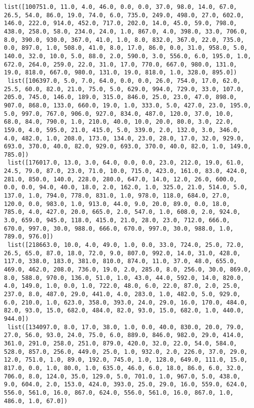 \documentclass[11pt]{article}
\begin{document}
\begin{Verbatim}[commandchars=\\\{\}]
 list([100751.0, 11.0, 4.0, 46.0, 0.0, 0.0, 37.0, 98.0, 14.0, 67.0, 26.5, 54.0, 86.0, 19.0, 74.0, 6.0, 735.0, 249.0, 498.0, 27.0, 602.0, 146.0, 222.0, 914.0, 452.0, 717.0, 202.0, 14.0, 45.0, 59.0, 798.0, 438.0, 258.0, 58.0, 234.0, 24.0, 1.0, 867.0, 4.0, 398.0, 33.0, 706.0, 8.0, 390.0, 930.0, 367.0, 41.0, 1.0, 8.0, 832.0, 367.0, 22.0, 735.0, 0.0, 897.0, 1.0, 508.0, 41.0, 8.0, 17.0, 86.0, 0.0, 31.0, 958.0, 5.0, 140.0, 32.0, 10.0, 5.0, 88.0, 2.0, 590.0, 3.0, 556.0, 6.0, 195.0, 1.0, 672.0, 264.0, 259.0, 22.0, 31.0, 17.0, 770.0, 667.0, 980.0, 131.0, 19.0, 818.0, 667.0, 980.0, 131.0, 19.0, 818.0, 1.0, 328.0, 895.0])
 list([106397.0, 5.0, 7.0, 64.0, 0.0, 0.0, 26.0, 754.0, 17.0, 62.0, 25.5, 60.0, 82.0, 21.0, 75.0, 5.0, 629.0, 994.0, 729.0, 33.0, 107.0, 205.0, 745.0, 146.0, 189.0, 315.0, 846.0, 25.0, 23.0, 47.0, 898.0, 907.0, 868.0, 133.0, 660.0, 19.0, 1.0, 333.0, 5.0, 427.0, 23.0, 195.0, 5.0, 997.0, 767.0, 906.0, 927.0, 834.0, 487.0, 120.0, 37.0, 10.0, 68.0, 84.0, 790.0, 1.0, 210.0, 40.0, 10.0, 20.0, 80.0, 3.0, 22.0, 159.0, 4.0, 595.0, 21.0, 415.0, 5.0, 339.0, 2.0, 132.0, 3.0, 346.0, 4.0, 482.0, 1.0, 208.0, 173.0, 134.0, 23.0, 28.0, 17.0, 32.0, 929.0, 693.0, 370.0, 40.0, 82.0, 929.0, 693.0, 370.0, 40.0, 82.0, 1.0, 149.0, 785.0])
 list([176017.0, 13.0, 3.0, 64.0, 0.0, 0.0, 23.0, 212.0, 19.0, 61.0, 24.5, 79.0, 87.0, 23.0, 71.0, 10.0, 715.0, 423.0, 161.0, 83.0, 424.0, 281.0, 850.0, 140.0, 228.0, 280.0, 647.0, 14.0, 12.0, 26.0, 600.0, 0.0, 0.0, 94.0, 40.0, 18.0, 2.0, 162.0, 1.0, 325.0, 21.0, 514.0, 5.0, 137.0, 1.0, 794.0, 778.0, 831.0, 1.0, 978.0, 118.0, 684.0, 27.0, 120.0, 0.0, 983.0, 1.0, 913.0, 44.0, 9.0, 20.0, 89.0, 0.0, 18.0, 785.0, 4.0, 427.0, 20.0, 665.0, 2.0, 547.0, 1.0, 608.0, 2.0, 924.0, 3.0, 659.0, 945.0, 118.0, 415.0, 21.0, 28.0, 23.0, 712.0, 666.0, 670.0, 997.0, 30.0, 988.0, 666.0, 670.0, 997.0, 30.0, 988.0, 1.0, 789.0, 976.0])
 list([218663.0, 10.0, 4.0, 49.0, 1.0, 0.0, 33.0, 724.0, 25.0, 72.0, 26.5, 65.0, 87.0, 18.0, 72.0, 9.0, 807.0, 992.0, 14.0, 31.0, 428.0, 117.0, 338.0, 183.0, 381.0, 810.0, 874.0, 11.0, 37.0, 48.0, 655.0, 469.0, 462.0, 208.0, 736.0, 19.0, 2.0, 285.0, 8.0, 256.0, 30.0, 869.0, 8.0, 588.0, 970.0, 136.0, 51.0, 1.0, 43.0, 44.0, 592.0, 14.0, 820.0, 4.0, 149.0, 1.0, 0.0, 1.0, 722.0, 48.0, 6.0, 22.0, 87.0, 2.0, 25.0, 237.0, 8.0, 487.0, 29.0, 441.0, 4.0, 283.0, 1.0, 482.0, 5.0, 929.0, 6.0, 210.0, 1.0, 623.0, 358.0, 393.0, 24.0, 29.0, 16.0, 170.0, 484.0, 82.0, 93.0, 15.0, 682.0, 484.0, 82.0, 93.0, 15.0, 682.0, 1.0, 440.0, 944.0])
 list([134097.0, 8.0, 17.0, 38.0, 1.0, 0.0, 40.0, 830.0, 20.0, 79.0, 27.0, 56.0, 93.0, 24.0, 75.0, 6.0, 889.0, 846.0, 982.0, 29.0, 414.0, 361.0, 291.0, 258.0, 251.0, 879.0, 420.0, 32.0, 22.0, 54.0, 584.0, 528.0, 857.0, 256.0, 449.0, 25.0, 1.0, 932.0, 2.0, 226.0, 37.0, 29.0, 12.0, 751.0, 1.0, 89.0, 192.0, 745.0, 1.0, 128.0, 649.0, 111.0, 15.0, 817.0, 0.0, 1.0, 80.0, 1.0, 635.0, 46.0, 6.0, 18.0, 86.0, 6.0, 32.0, 706.0, 8.0, 124.0, 35.0, 129.0, 5.0, 701.0, 1.0, 967.0, 5.0, 438.0, 9.0, 604.0, 2.0, 153.0, 424.0, 393.0, 25.0, 29.0, 16.0, 559.0, 624.0, 556.0, 561.0, 16.0, 867.0, 624.0, 556.0, 561.0, 16.0, 867.0, 1.0, 486.0, 1.0, 67.0])

\end{Verbatim}
\end{document}
